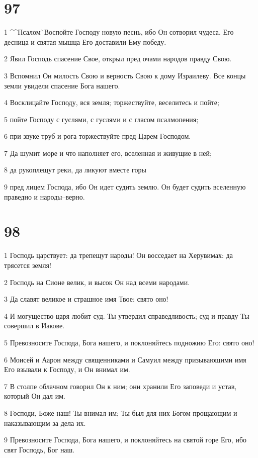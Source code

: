 \chapter{97}

\par 1 ^^Псалом^^ Воспойте Господу новую песнь, ибо Он сотворил чудеса. Его десница и святая мышца Его доставили Ему победу.
\par 2 Явил Господь спасение Свое, открыл пред очами народов правду Свою.
\par 3 Вспомнил Он милость Свою и верность Свою к дому Израилеву. Все концы земли увидели спасение Бога нашего.
\par 4 Восклицайте Господу, вся земля; торжествуйте, веселитесь и пойте;
\par 5 пойте Господу с гуслями, с гуслями и с гласом псалмопения;
\par 6 при звуке труб и рога торжествуйте пред Царем Господом.
\par 7 Да шумит море и что наполняет его, вселенная и живущие в ней;
\par 8 да рукоплещут реки, да ликуют вместе горы
\par 9 пред лицем Господа, ибо Он идет судить землю. Он будет судить вселенную праведно и народы--верно.

\chapter{98}

\par 1 Господь царствует: да трепещут народы! Он восседает на Херувимах: да трясется земля!
\par 2 Господь на Сионе велик, и высок Он над всеми народами.
\par 3 Да славят великое и страшное имя Твое: свято оно!
\par 4 И могущество царя любит суд. Ты утвердил справедливость; суд и правду Ты совершил в Иакове.
\par 5 Превозносите Господа, Бога нашего, и поклоняйтесь подножию Его: свято оно!
\par 6 Моисей и Аарон между священниками и Самуил между призывающими имя Его взывали к Господу, и Он внимал им.
\par 7 В столпе облачном говорил Он к ним; они хранили Его заповеди и устав, который Он дал им.
\par 8 Господи, Боже наш! Ты внимал им; Ты был для них Богом прощающим и наказывающим за дела их.
\par 9 Превозносите Господа, Бога нашего, и поклоняйтесь на святой горе Его, ибо свят Господь, Бог наш.

